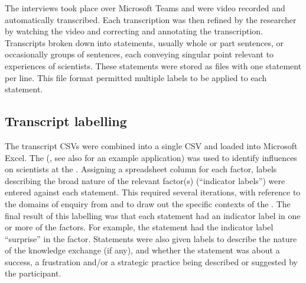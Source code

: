 The interviews took place over Microsoft Teams and were video recorded and automatically transcribed. Each transcription was then refined by the researcher by watching the video and correcting and annotating the transcription. Transcripts broken down into statements, usually whole or part sentences, or occasionally groups of sentences, each conveying singular point relevant to experiences of scientists. These statements were stored as \CSV{} files with one statement per line. This file format permitted multiple labels to be applied to each statement.
\subsection{Transcript labelling}\label{sec:metlabelling}

The transcript CSVs were combined into a single CSV and loaded into Microsoft Excel. The \ISM{} (\cite{DarntonH2013}, see also \cite{MinamitaniDOI2024} for an example application) was used to identify influences on scientists at the \SPI. Assigning a spreadsheet column for each \ISM{} factor, labels describing the broad nature of the relevant factor(s) (``indicator labels'') were entered against each statement. This required several iterations, with reference to the domains of enquiry from \textcite{BuseMW2012} and \textcite{HaynesDCRHGS2011} to draw out the specific contexts of the \SPI. The final result of this labelling was that each statement had an indicator label in one or more of the \ISM{} factors. For example, the statement  had the indicator label ``surprise'' in the \ismie{} factor. Statements were also given labels to describe the nature of the knowledge exchange (if any), and whether the statement was about a success, a frustration and/or a strategic practice being described or suggested by the participant.





